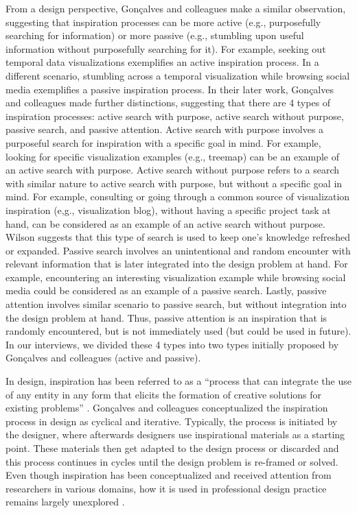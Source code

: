 From a design perspective, Gon\c{c}alves and colleagues \cite{goncalves_what_2014} make a similar observation, suggesting that inspiration processes can be more active (e.g., purposefully searching for information) or more passive (e.g., stumbling upon useful information without purposefully searching for it). For example, seeking out temporal data visualizations exemplifies an active inspiration process. In a different scenario, stumbling across a temporal visualization while browsing social media exemplifies a passive inspiration process. In their later work, Gon\c{c}alves and colleagues \cite{goncalves_inspiration_2016} made further distinctions, suggesting that there are 4 types of inspiration processes: active search with purpose, active search without purpose, passive search, and passive attention. Active search with purpose involves a purposeful search for inspiration with a specific goal in mind. For example, looking for specific visualization examples (e.g., treemap) can be an example of an active search with purpose. Active search without purpose refers to a search with similar nature to active search with purpose, but without a specific goal in mind. For example, consulting or going through a common source of visualization inspiration (e,g., visualization blog), without having a specific project task at hand, can be considered as an example of an active search without purpose. Wilson \cite{wilson_information_1997} suggests that this type of search is used to keep one's knowledge refreshed or expanded. Passive search involves an unintentional and random encounter with relevant information that is later integrated into the design problem at hand. For example, encountering an interesting visualization example while browsing social media could be considered as an example of a passive search. Lastly, passive attention involves similar scenario to passive search, but without integration into the design problem at hand. Thus, passive attention is an inspiration that is randomly encountered, but is not immediately used (but could be used in future). In our interviews, we divided these 4 types into two types initially proposed by Gon\c{c}alves and colleagues (active and passive). 

In design, inspiration has been referred to as a ``process that can integrate the use of any entity in any form that elicits the formation of creative solutions for existing problems'' \cite[p. 29]{goncalves_what_2014}. Gon\c{c}alves and colleagues \cite{goncalves_inspiration_2016} conceptualized the inspiration process in design as cyclical and iterative. Typically, the process is initiated by the designer, where afterwards designers use inspirational materials as a starting point. These materials then get adapted to the design process or discarded and this process continues in cycles until the design problem is re-framed or solved. Even though inspiration has been conceptualized and received attention from researchers in various domains, how it is used in professional design practice remains largely unexplored \cite{scolere_digital_2021}.

